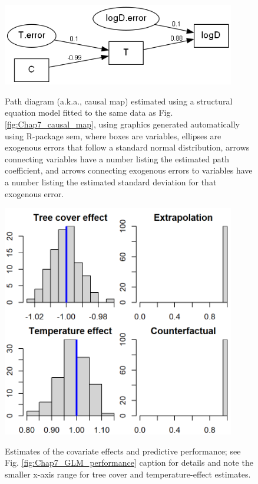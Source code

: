 \begin{figure}[!ht]
    \caption[Estimated path diagram for fitted structural equation model]{Path diagram (a.k.a., causal map) estimated using a structural equation model fitted to the same data as Fig. \ref{fig:Chap7_causal_map}, using graphics generated automatically using R-package \colorbox{backcolour}{sem}, where boxes are variables, ellipses are exogenous errors that follow a standard normal distribution, arrows connecting variables have a number listing the estimated path coefficient, and arrows connecting exogenous errors to variables have a number listing the estimated standard deviation for that exogenous error.} 
    \centering
    \includegraphics[width=4in]{Chap_7/path.png}
    \label{fig:Chap7_path_diagram}
\end{figure}

\begin{figure}[!ht]
    \caption[Simulated performance of a SEM when fitting a causal map]{Estimates of the covariate effects and predictive performance; see Fig. \ref{fig:Chap7_GLM_performance} caption for details and note the smaller x-axis range for tree cover and temperature-effect estimates.}
    \centering
    \includegraphics[width=4in]{Chap_7/SEM_performance.png}
    \label{fig:Chap7_SEM_performance}
\end{figure}

